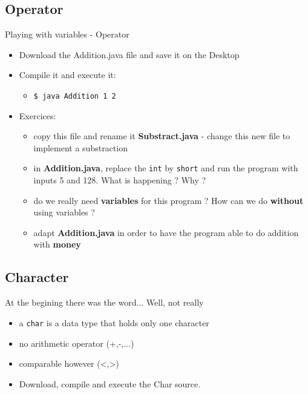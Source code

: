{  \subsection{Operator}
  \begin{frame}
    \begin{block}{Playing with variables - Operator}
      \begin{itemize}
        \item Download the Addition.java file and save it on the Desktop
        \item Compile it and execute it:
        \begin{itemize}
          \item \texttt{\$ java Addition 1 2}
        \end{itemize}
        \item Exercices:
        \begin{itemize}
          \item copy this file and rename it \textbf{Substract.java} - change this new file to
          implement a substraction
          \item in \textbf{Addition.java}, replace the \texttt{int} by \texttt{short} and run the
          program with inputs 5 and 128. What is happening ? Why ?
          \item do we really need \textbf{variables} for this program ? How can we do
          \textbf{without} using variables ?
          \item adapt \textbf{Addition.java} in order to have the program able to do addition with
          \textbf{money}
        \end{itemize}
      \end{itemize}
    \end{block}
  \end{frame}

   \subsection{Character}
   \begin{frame}
    \begin{block}{At the begining there was the word... Well, not really}
      \begin{itemize}
        \item a \texttt{char} is a data type that holds only one character
        \item no arithmetic operator (+,-,...)
        \item comparable however (<,>)
        \item Download, compile and execute the Char source.
      \end{itemize}
    \end{block}
   \end{frame}

}
